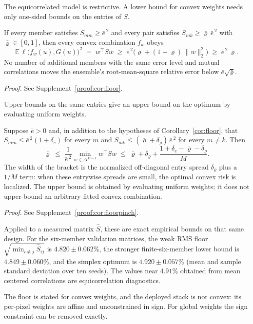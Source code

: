 The equicorrelated model is restrictive. A lower bound for convex weights
needs only one-sided bounds on the entries of $S$.

\begin{corollary}\label{cor:floor}
If every member satisfies $S_{mm}\ge\bar e^{\,2}$ and every pair satisfies
$S_{mk}\ge\bar\varrho\,\bar e^{\,2}$ with $\bar\varrho\in[0,1]$, then every
convex combination $f_w$ obeys
\[
\mathbb E\,\ell\big(f_w(u),G(u)\big)^2\;=\;w^\top Sw\;\ge\;
\bar e^{\,2}\big(\bar\varrho+(1-\bar\varrho)\,\|w\|_2^2\big)\;\ge\;
\bar e^{\,2}\,\bar\varrho .
\]
No number of additional members with the same error level and mutual
correlations moves the ensemble's root-mean-square relative error below
$\bar e\sqrt{\bar\varrho}$.
\end{corollary}
\noindent\emph{Proof.} See Supplement~\ref{proof:cor:floor}.


Upper bounds on the same entries give an upper bound on the optimum by
evaluating uniform weights.

\begin{corollary}\label{cor:floorpinch}
Suppose $\bar e>0$ and, in addition to the hypotheses of Corollary~\ref{cor:floor}, that
$S_{mm}\le\bar e^{\,2}(1+\delta_e)$ for every $m$ and
$S_{mk}\le(\bar\varrho+\delta_\varrho)\,\bar e^{\,2}$ for every $m\neq k$.
Then
\[
\bar\varrho\;\le\;\frac{1}{\bar e^{\,2}}\min_{w\in\Delta^{M-1}}w^\top Sw
\;\le\;\bar\varrho+\delta_\varrho+\frac{1+\delta_e-\bar\varrho-\delta_\varrho}{M}.
\]
The width of the bracket is the normalized off-diagonal entry spread
$\delta_\varrho$ plus a $1/M$ term: when these entrywise spreads are small, the optimal convex risk is localized. The upper bound is obtained by evaluating uniform weights; it does not upper-bound an arbitrary fitted convex combination.
\end{corollary}
\noindent\emph{Proof.} See Supplement~\ref{proof:cor:floorpinch}.


Applied to a measured matrix $\widehat S$, these are exact empirical bounds on that same design. For the six-member validation matrices, the weak RMS floor $\sqrt{\min_{i\ne j}\widehat S_{ij}}$ is $4.820\pm0.062\%$, the stronger finite-six-member lower bound is $4.849\pm0.060\%$, and the simplex optimum is $4.920\pm0.057\%$ (mean and sample standard deviation over ten seeds). The values near $4.91\%$ obtained from mean centered correlations are equicorrelation diagnostics.

The floor is stated for convex weights, and the deployed stack is not
convex: its per-pixel weights are affine and unconstrained in sign. For
global weights the sign constraint can be removed exactly.

